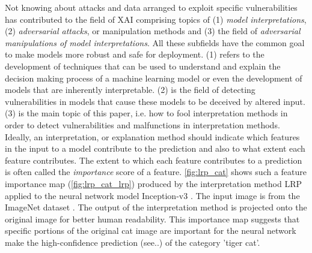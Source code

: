 Not knowing about attacks and data arranged to exploit specific vulnerabilities has contributed to the field of XAI comprising topics of (1) \textit{model interpretations}, (2) \textit{adversarial attacks}, or manipulation methods and (3) the field of \textit{adversarial manipulations of model interpretations}. All these subfields have the common goal to make models more robust and safe for deployment. 
(1) refers to the development of techniques that can be used to understand and explain the decision making process of a machine learning model or even the development of models that are inherently interpretable. (2) is the field of detecting vulnerabilities in models that cause these models to be deceived by altered input. 
(3) is the main topic of this paper, i.e. how to fool interpretation methods in order to detect vulnerabilities and malfunctions in interpretation methods. 
Ideally, an interpretation, or explanation method should indicate which features in the input to a model contribute to the prediction and also to what extent each feature contributes. The extent to which each feature contributes to a prediction is often called the \textit{importance} score of a feature. \autoref{fig:lrp_cat} shows such a feature importance map (\autoref{fig:lrp_cat_lrp}) produced by the interpretation method LRP \cite{bach2015pixel} applied to the neural network model Inception-v3 \cite{szegedy2016rethinking}. The input image is from the ImageNet dataset \cite{ILSVRC15}. The output of the interpretation method is projected onto the original image for better human readability. This importance map suggests that specific portions of the original cat image are important for the neural network make the high-confidence prediction (see..) of the category 'tiger cat'. 


